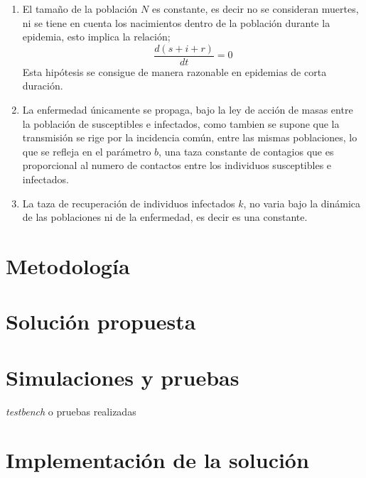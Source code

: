 \documentclass[journal]{IEEEtran}
\begin{document}
\begin{enumerate}
  \item  El tamaño de la población $N$ es constante, es decir no se consideran muertes, ni se tiene en cuenta los nacimientos dentro de la población
  durante la epidemia, esto implica la relación;
  \begin{equation*}
  \frac{d(s+i+r)}{dt} = 0
  \end{equation*}
  Esta hipótesis se consigue de manera razonable en epidemias de corta duración.
  \item La enfermedad únicamente se propaga, bajo la ley de acción de masas entre la población de susceptibles e infectados, como
  tambien se supone que la transmisión se rige por la incidencia común, entre las mismas poblaciones, lo que se refleja en el parámetro
  $b$, una taza constante de contagios que es proporcional al numero de contactos entre los individuos susceptibles e infectados. 
  \item La taza de recuperación de individuos infectados $k$, no varia bajo la dinámica de las poblaciones ni de la enfermedad, es decir es una constante.
\end{enumerate}


\section{Metodología}	



\section{Solución propuesta}



\section{Simulaciones y pruebas}
\emph{testbench} o pruebas realizadas



\section{Implementación de la solución}
\end{document}
